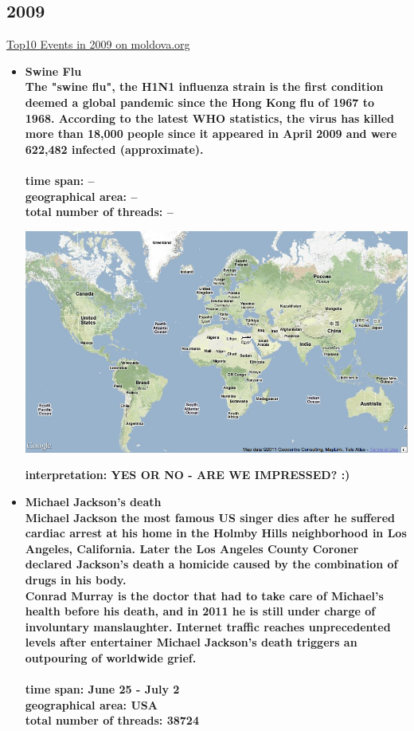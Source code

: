 \documentclass[11pt,a4paper,english]{article}
\begin{document}
			\subsection{2009}
			\href{http://social.moldova.org/news/10-most-important-world-events-of-2009-217390-eng.html}{Top10 Events in 2009 on moldova.org}
				\begin{itemize}
					\item \bf Swine Flu \rm
						\\ The "swine flu", the H1N1 influenza strain is the first condition deemed a global pandemic since the Hong Kong flu of 1967 to 1968. According to the latest WHO statistics, the virus has killed more than 18,000 people since it appeared in April 2009 and were 622,482 infected (approximate).
						\\\\ \bf time span: \rm --
						\\ \bf geographical area: \rm --
						\\ \bf total number of threads: \rm --
						
						\includegraphics[width=130mm]{img/2005-1}
						
						\bf interpretation: \rm YES OR NO - ARE WE IMPRESSED? :)
						
						
						
					\item \bf Michael Jackson's death \rm
						\\ Michael Jackson the most famous US singer dies after he suffered cardiac arrest at his home in the Holmby Hills neighborhood in Los Angeles, California. Later the Los Angeles County Coroner declared Jackson's death a homicide caused by the combination of drugs in his body.
\\ Conrad Murray is the doctor that had to take care of Michael's health before his death, and in 2011 he is still under charge of involuntary manslaughter. Internet traffic reaches unprecedented levels after entertainer Michael Jackson's death triggers an outpouring of worldwide grief.
						\\\\ \bf time span: \rm June 25 - July 2
						\\ \bf geographical area: \rm USA
						\\ \bf total number of threads: \rm 38724
						

\end{itemize}
\end{document}
